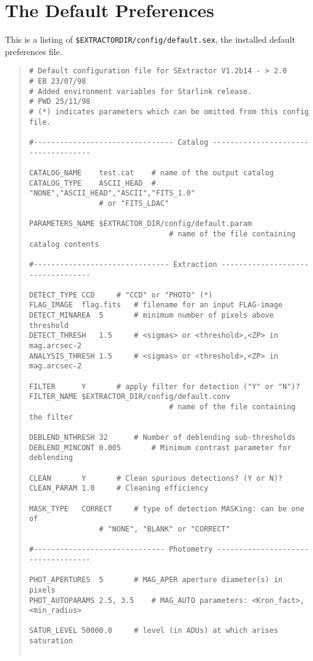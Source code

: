 \documentclass[twoside,11pt]{article}
\newcommand{\xlabel}[1]{}
\renewcommand{\_}{\texttt{\symbol{95}}}
\begin{document}
\section{\label{default_sex}\xlabel{the_default_preferences}The Default
Preferences}
This is a listing of \texttt{\$EXTRACTOR\_DIR/config/default.sex}, the 
installed default preferences file.
\small
\begin{quote} \begin{verbatim}
# Default configuration file for SExtractor V1.2b14 - > 2.0
# EB 23/07/98
# Added environment variables for Starlink release.
# PWD 25/11/98
# (*) indicates parameters which can be omitted from this config file.

#-------------------------------- Catalog ------------------------------------

CATALOG_NAME	test.cat	# name of the output catalog
CATALOG_TYPE	ASCII_HEAD	# "NONE","ASCII_HEAD","ASCII","FITS_1.0"
				# or "FITS_LDAC"

PARAMETERS_NAME	$EXTRACTOR_DIR/config/default.param	
                                # name of the file containing catalog contents

#------------------------------- Extraction ----------------------------------

DETECT_TYPE	CCD		# "CCD" or "PHOTO" (*)
FLAG_IMAGE	flag.fits	# filename for an input FLAG-image
DETECT_MINAREA	5		# minimum number of pixels above threshold
DETECT_THRESH	1.5		# <sigmas> or <threshold>,<ZP> in mag.arcsec-2
ANALYSIS_THRESH	1.5		# <sigmas> or <threshold>,<ZP> in mag.arcsec-2

FILTER		Y		# apply filter for detection ("Y" or "N")?
FILTER_NAME	$EXTRACTOR_DIR/config/default.conv	
                                # name of the file containing the filter

DEBLEND_NTHRESH	32		# Number of deblending sub-thresholds
DEBLEND_MINCONT	0.005		# Minimum contrast parameter for deblending

CLEAN		Y		# Clean spurious detections? (Y or N)?
CLEAN_PARAM	1.0		# Cleaning efficiency

MASK_TYPE	CORRECT		# type of detection MASKing: can be one of
				# "NONE", "BLANK" or "CORRECT"

#------------------------------ Photometry -----------------------------------

PHOT_APERTURES	5		# MAG_APER aperture diameter(s) in pixels
PHOT_AUTOPARAMS	2.5, 3.5	# MAG_AUTO parameters: <Kron_fact>,<min_radius>

SATUR_LEVEL	50000.0		# level (in ADUs) at which arises saturation


\end{verbatim}
\end{quote}
\end{document}
